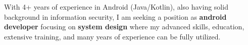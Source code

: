 

\begin{cvparagraph}


With 4+ years of experience in Android (Java/Kotlin), also having solid background in information security, I am seeking a position as \textbf{android developer} focusing on \textbf{system design} where my advanced skills, education, extensive training, and many years of experience can be fully utilized.

\end{cvparagraph}
